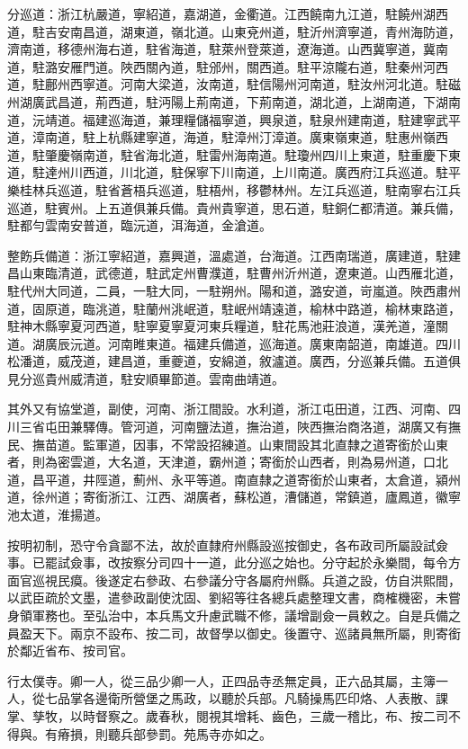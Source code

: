 分巡道：浙江杭嚴道，寧紹道，嘉湖道，金衢道。江西饒南九江道，駐饒州湖西道，駐吉安南昌道，湖東道，嶺北道。山東兗州道，駐沂州濟寧道，青州海防道，濟南道，移德州海右道，駐省海道，駐萊州登萊道，遼海道。山西冀寧道，冀南道，駐潞安雁門道。陜西關內道，駐邠州，關西道。駐平涼隴右道，駐秦州河西道，駐鄜州西寧道。河南大梁道，汝南道，駐信陽州河南道，駐汝州河北道。駐磁州湖廣武昌道，荊西道，駐沔陽上荊南道，下荊南道，湖北道，上湖南道，下湖南道，沅靖道。福建巡海道，兼理糧儲福寧道，興泉道，駐泉州建南道，駐建寧武平道，漳南道，駐上杭縣建寧道，海道，駐漳州汀漳道。廣東嶺東道，駐惠州嶺西道，駐肇慶嶺南道，駐省海北道，駐雷州海南道。駐瓊州四川上東道，駐重慶下東道，駐達州川西道，川北道，駐保寧下川南道，上川南道。廣西府江兵巡道。駐平樂桂林兵巡道，駐省蒼梧兵巡道，駐梧州，移鬱林州。左江兵巡道，駐南寧右江兵巡道，駐賓州。上五道俱兼兵備。貴州貴寧道，思石道，駐銅仁都清道。兼兵備，駐都勻雲南安普道，臨沅道，洱海道，金滄道。

整飭兵備道：浙江寧紹道，嘉興道，溫處道，台海道。江西南瑞道，廣建道，駐建昌山東臨清道，武德道，駐武定州曹濮道，駐曹州沂州道，遼東道。山西雁北道，駐代州大同道，二員，一駐大同，一駐朔州。陽和道，潞安道，岢嵐道。陜西肅州道，固原道，臨洮道，駐蘭州洮岷道，駐岷州靖遠道，榆林中路道，榆林東路道，駐神木縣寧夏河西道，駐寧夏寧夏河東兵糧道，駐花馬池莊浪道，漢羌道，潼關道。湖廣辰沅道。河南睢東道。福建兵備道，巡海道。廣東南韶道，南雄道。四川松潘道，威茂道，建昌道，重夔道，安綿道，敘瀘道。廣西，分巡兼兵備。五道俱見分巡貴州威清道，駐安順畢節道。雲南曲靖道。

其外又有協堂道，副使，河南、浙江間設。水利道，浙江屯田道，江西、河南、四川三省屯田兼驛傳。管河道，河南鹽法道，撫治道，陜西撫治商洛道，湖廣又有撫民、撫苗道。監軍道，因事，不常設招練道。山東間設其北直隸之道寄銜於山東者，則為密雲道，大名道，天津道，霸州道；寄銜於山西者，則為易州道，口北道，昌平道，井陘道，薊州、永平等道。南直隸之道寄銜於山東者，太倉道，潁州道，徐州道；寄銜浙江、江西、湖廣者，蘇松道，漕儲道，常鎮道，廬鳳道，徽寧池太道，淮揚道。

按明初制，恐守令貪鄙不法，故於直隸府州縣設巡按御史，各布政司所屬設試僉事。已罷試僉事，改按察分司四十一道，此分巡之始也。分守起於永樂間，每令方面官巡視民瘼。後遂定右參政、右參議分守各屬府州縣。兵道之設，仿自洪熙間，以武臣疏於文墨，遣參政副使沈固、劉紹等往各總兵處整理文書，商榷機密，未嘗身領軍務也。至弘治中，本兵馬文升慮武職不修，議增副僉一員敕之。自是兵備之員盈天下。兩京不設布、按二司，故督學以御史。後置守、巡諸員無所屬，則寄銜於鄰近省布、按司官。

行太僕寺。卿一人，從三品少卿一人，正四品寺丞無定員，正六品其屬，主簿一人，從七品掌各邊衛所營堡之馬政，以聽於兵部。凡騎操馬匹印烙、人表散、課掌、孳牧，以時督察之。歲春秋，閱視其增耗、齒色，三歲一稽比，布、按二司不得與。有瘠損，則聽兵部參罰。苑馬寺亦如之。

